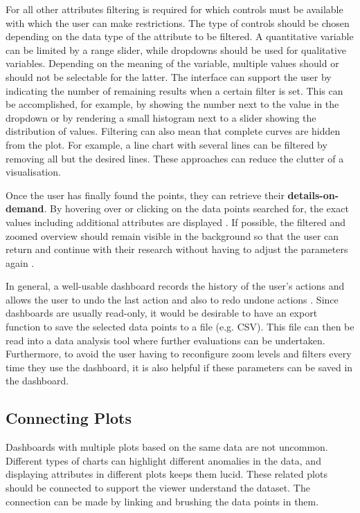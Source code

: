 \documentclass[11pt]{article}
\begin{document}
For all other attributes filtering is required for which controls must be available with which the user can make restrictions. The type of controls should be chosen depending on the data type of the attribute to be filtered. A quantitative variable can be limited by a range slider, while dropdowns should be used for qualitative variables. Depending on the meaning of the variable, multiple values should or should not be selectable for the latter. The interface can support the user by indicating the number of remaining results when a certain filter is set. This can be accomplished, for example, by showing the number next to the value in the dropdown or by rendering a small histogram next to a slider showing the distribution of values. Filtering can also mean that complete curves are hidden from the plot. For example, a line chart with several lines can be filtered by removing all but the desired lines. These approaches can reduce the clutter of a visualisation.

Once the user has finally found the points, they can retrieve their \textbf{details-on-demand}. By hovering over or clicking on the data points searched for, the exact values including additional attributes are displayed \parencite{shneiderman_thousand-fold_1997}. If possible, the filtered and zoomed overview should remain visible in the background so that the user can return and continue with their research without having to adjust the parameters again \parencite{shneiderman_eyes_1996}. 

In general, a well-usable dashboard records the history of the user's actions and allows the user to undo the last action and also to redo undone actions \parencite{shneiderman_eyes_1996}. Since dashboards are usually read-only, it would be desirable to have an export function to save the selected data points to a file (e.g. CSV). This file can then be read into a data analysis tool where further evaluations can be undertaken. Furthermore, to avoid the user having to reconfigure zoom levels and filters every time they use the dashboard, it is also helpful if these parameters can be saved in the dashboard.

\subsection{Connecting Plots}

Dashboards with multiple plots based on the same data are not uncommon. Different types of charts can highlight different anomalies in the data, and displaying attributes in different plots keeps them lucid. These related plots should be connected to support the viewer understand the dataset. The connection can be made by linking and brushing the data points in them.
\end{document}
